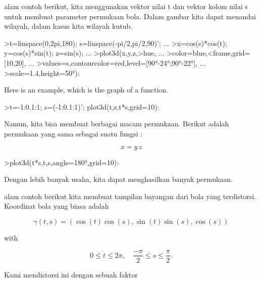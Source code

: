 \documentclass[a4paper,10pt]{article}
\begin{document}
\begin{eulernotebook}
\begin{eulercomment}
alam contoh berikut, kita menggunakan vektor nilai t dan vektor kolom
nilai s untuk membuat parameter permukaan bola. Dalam gambar kita
dapat menandai wilayah, dalam kasus kita wilayah kutub.
\end{eulercomment}
\begin{eulerprompt}
>t=linspace(0,2pi,180); s=linspace(-pi/2,pi/2,90)'; ...
>x=cos(s)*cos(t); y=cos(s)*sin(t); z=sin(s); ...
>plot3d(x,y,z,>hue, ...
>color=blue,<frame,grid=[10,20], ...
>values=s,contourcolor=red,level=[90°-24°;90°-22°], ...
>scale=1.4,height=50°):
\end{eulerprompt}
\begin{eulercomment}
Here is an example, which is the graph of a function.
\end{eulercomment}
\begin{eulerprompt}
>t=-1:0.1:1; s=(-1:0.1:1)'; plot3d(t,s,t*s,grid=10):
\end{eulerprompt}
\begin{eulercomment}
Namun, kita bisa membuat berbagai macam permukaan. Berikut adalah
permukaan yang sama sebagai suatu fungsi :

\end{eulercomment}
\begin{eulerformula}
\[
x = y \, z
\]
\end{eulerformula}
\begin{eulerprompt}
>plot3d(t*s,t,s,angle=180°,grid=10):
\end{eulerprompt}
\begin{eulercomment}
Dengan lebih banyak usaha, kita dapat menghasilkan banyak permukaan.


alam contoh berikut kita membuat tampilan bayangan dari bola yang
terdistorsi. Koordinat bola yang biasa adalah

\end{eulercomment}
\begin{eulerformula}
\[
\gamma(t,s) = (\cos(t)\cos(s),\sin(t)\sin(s),\cos(s))
\]
\end{eulerformula}
\begin{eulercomment}
with

\end{eulercomment}
\begin{eulerformula}
\[
0 \le t \le 2\pi, \quad \frac{-\pi}{2} \le s \le \frac{\pi}{2}.
\]
\end{eulerformula}
\begin{eulercomment}
Kami mendistorsi ini dengan sebuah faktor


\end{eulercomment}
\end{eulernotebook}
\end{document}
